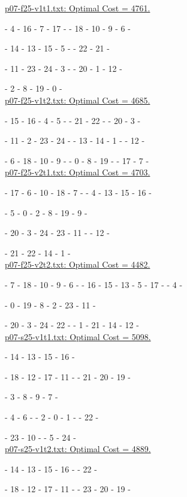\underline{p07-f25-v1t1.txt: Optimal Cost = 4761.} 

\ta - 4 - 16 - 7 - 17 - \ta - 18 - 10 - 9 - 6 - \ta

\tc - 14 - 13 - 15 - 5 - \tc - 22 - 21 - \tc

\tc - 11 - 23 - 24 - 3 - \tc - 20 - 1 - 12 - \tc

\tc - 2 - 8 - 19 - 0 - \tc
\\

\underline{p07-f25-v1t2.txt: Optimal Cost = 4685.} 

\tc - 15 - 16 - 4 - 5 - \tc - 21 - 22 - \tc - 20 - 3 - \tc

\tc - 11 - 2 - 23 - 24 - \tc - 13 - 14 - 1 - \tc - 12 - \tc

\te - 6 - 18 - 10 - 9 - \te - 0 - 8 - 19 - \te - 17 - 7 - \te
\\

\underline{p07-f25-v2t1.txt: Optimal Cost = 4703.} 

\ta - 17 - 6 - 10 - 18 - 7 - \ta - 4 - 13 - 15 - 16 - \ta

\ta - 5 - 0 - 2 - 8 - 19 - 9 - \ta

\tc - 20 - 3 - 24 - 23 - 11 - \tc - 12 - \tc

\tc - 21 - 22 - 14 - 1 - \tc
\\

\underline{p07-f25-v2t2.txt: Optimal Cost =  4482.} 

\ta - 7 - 18 - 10 - 9 - 6 - \ta - 16 - 15 - 13 - 5 - 17 - \ta - 4 - \ta

\tc - 0 - 19 - 8 - 2 - 23 - 11 - \tc 

\tc - 20 - 3 - 24 - 22 - \tc - 1 - 21 - 14 - 12 - \tc
\\

\underline{p07-s25-v1t1.txt: Optimal Cost = 5098.}

\ta - 14 - 13 - 15 - 16 - \ta 

\ta - 18 - 12 - 17 - 11 - \ta - 21 - 20 - 19 - \ta 

\te - 3 - 8 - 9 - 7 - \te

\te - 4 - 6 - \te - 2 - 0 - 1 - \te - 22 - \te

\te - 23 - 10 - \te - 5 - 24 - \te
\\

\underline{p07-s25-v1t2.txt: Optimal Cost = 4889.}

\ta - 14 - 13 - 15 - 16 - \ta - 22 - \ta

\ta - 18 - 12 - 17 - 11 - \ta - 23 - 20 - 19 - \ta

